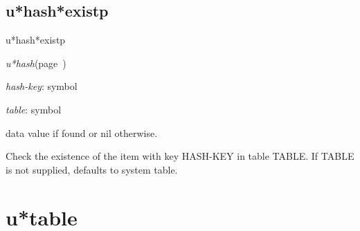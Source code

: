 \subsection{u*hash*existp}
\label{u*hash*existp}

\begin{description}
\item [Name:]  u*hash*existp

\item [Class:]
{\sl u*hash}\hfill(page~\pageref{u*hash})

\item [Parameters:]
\item {\sl hash-key}:  symbol

\item {\sl table}:  symbol


\item [Return-value:] 
data value if found or nil otherwise.

\item [Description:]
Check the existence of the item with key HASH-KEY in
table TABLE. If TABLE is not supplied, defaults
to system table.

\item [Public:]




\end{description}
\horizontalline

\section{u*table}
\label{u*table}

